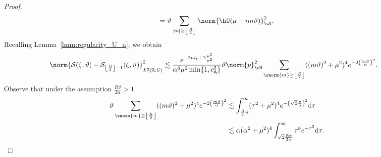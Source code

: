 \begin{proof}
\begin{align}
    =\vartheta  \sum_{|m|\geq\left\lfloor \frac{R}{2} \right\rfloor} \norm{\hU(\mu+\imath m\vartheta)}_\cV^2.
\end{align}
Recalling Lemma~\ref{lmm:regularity_U_n}, we obtain
\begin{equation}
\begin{aligned}
    \norm{
        \mathcal{S}(\zeta,\vartheta)
        -
        \mathcal{S}_{\left\lfloor \frac{R}{2} \right\rfloor-1}(\zeta,\vartheta)
    }^2_{L^2(\mathbb{R};\mathcal{V})}
    &
    \lesssim
    \frac{
        e^{-2\mu t_0 +2\frac{\mu^2}{\alpha^2}}
        }{
         \alpha^6  \mu^2\min\{1, c^2_{\mathsf{A}}\}
    }
    \vartheta \norm{p}^2_{\cH}
    \sum_{\snorm{m}\geq\left\lfloor \frac{R}{2} \right\rfloor}
	((m \vartheta)^2+\mu^2)^{4}
	e^{
		-2{\left(\frac{m \vartheta}{\alpha}\right)^2}
	}
	.
\end{aligned}
\end{equation}
Observe that under the assumption $\frac{R \vartheta}{2 \alpha} >1$
\begin{equation}
\begin{aligned}
    \vartheta
    \sum_{\snorm{m}\geq\left\lfloor \frac{R}{2} \right\rfloor}
	((m \vartheta)^2+\mu^2)^{4}
	e^{
		-2{\left(\frac{m \vartheta}{\alpha}\right)^2}
	}
	&
    \lesssim
    \int_{\frac{R}{2} \vartheta }^{\infty}
	(\tau^2+\mu^2)^{4}
	e^{
		-{\left(\sqrt{2}\frac{\tau}{\alpha}\right)^2}
	}
    \text{d}\tau
    \\
    &
    \lesssim
    \alpha
    (\alpha^2+\mu^2)^4
    \int_{\sqrt{2} \frac{R \vartheta}{2 \alpha} }^{\infty}
	\tau^{8}
	e^{
		-\tau^2
	}
    \text{d}\tau.
\end{aligned}

\end{equation}
\end{proof}
